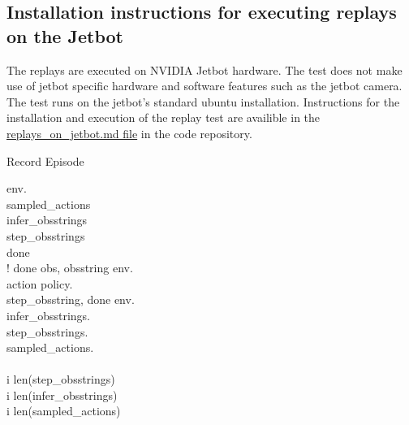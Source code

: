\subsection{Installation instructions for executing replays on the Jetbot}

The replays are executed on NVIDIA Jetbot hardware. The test does not make use of jetbot specific hardware and software features such as the jetbot camera. The test runs on the jetbot's standard ubuntu installation. Instructions for the installation and execution of the replay test are availible in the \href{https://github.com/geschnee/carsim-rl-cnn/blob/main/replays_on_jetbot.md}{replays\_on\_jetbot.md file} in the code repository. 


\renewcommand{\thepseudonum}{\roman{pseudonum}}
\begin{pseudocode}{Record Episode}{ }
\\


env.\\

sampled\_actions \GETS [] \\
infer\_obsstrings \GETS [] \\
step\_obsstrings \GETS [] \\

done \GETS \FALSE\\

\WHILE ! done \DO
\BEGIN
obs, obsstring \GETS env.\\
action \GETS policy.\\

step\_obsstring, done \GETS env.\\

infer\_obsstrings.\\
step\_obsstrings.\\
sampled\_actions.\\
\END\\

\FOR i  \TO len(step\_obsstrings) \DO
    \\
\FOR i  \TO len(infer\_obsstrings) \DO
    \\
\FOR i  \TO len(sampled\_actions) \DO
    \\


\ENDPROCEDURE
\label{pseudocode:record_episode}
\end{pseudocode}

